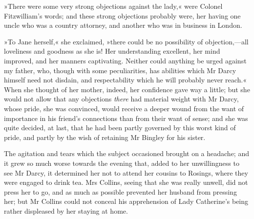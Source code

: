 »There were some very strong objections against the lady,« were Colonel Fitzwilliam's words; and these strong objections probably were, her having one uncle who was a country attorney, and another who was in business in London.

»To Jane herself,« she exclaimed, »there could be no possibility of objection,—all loveliness and goodness as she is! Her understanding excellent, her mind improved, and her manners captivating. Neither could anything be urged against my father, who, though with some peculiarities, has abilities which Mr Darcy himself need not disdain, and respectability which he will probably never reach.« When she thought of her mother, indeed, her confidence gave way a little; but she would not allow that any objections \textit{there} had material weight with Mr Darcy, whose pride, she was convinced, would receive a deeper wound from the want of importance in his friend's connections than from their want of sense; and she was quite decided, at last, that he had been partly governed by this worst kind of pride, and partly by the wish of retaining Mr Bingley for his sister.

The agitation and tears which the subject occasioned brought on a headache; and it grew so much worse towards the evening that, added to her unwillingness to see Mr Darcy, it determined her not to attend her cousins to Rosings, where they were engaged to drink tea. Mrs Collins, seeing that she was really unwell, did not press her to go, and as much as possible prevented her husband from pressing her; but Mr Collins could not conceal his apprehension of Lady Catherine's being rather displeased by her staying at home.
